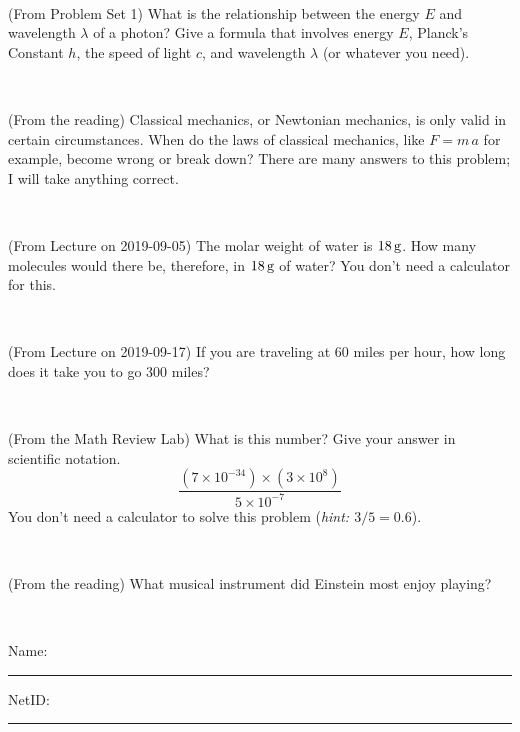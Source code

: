 \documentclass[12pt, letterpaper]{article}
\begin{document}
\vfill ~

\begin{problem} (From Problem Set 1)
What is the relationship between the energy $E$ and wavelength
$\lambda$ of a photon? Give a formula that involves energy $E$,
Planck's Constant $h$, the speed of light $c$, and wavelength
$\lambda$ (or whatever you need).
\end{problem}

\vfill ~

\begin{problem} (From the reading)
Classical mechanics, or Newtonian mechanics, is only valid in certain
circumstances. When do the laws of classical mechanics, like $F =
m\,a$ for example, become wrong or break down? There are many answers
to this problem; I will take anything correct.
\end{problem}


\vfill ~


\clearpage


\begin{problem} (From Lecture on 2019-09-05)
The molar weight of water is $18\,\mathrm{g}$. How many molecules would there
be, therefore, in $18\,\mathrm{g}$ of water? You don't need a calculator for
this.
\end{problem}


\vfill ~

\begin{problem} (From Lecture on 2019-09-17)
If you are traveling at 60 miles per hour, how long does
it take you to go 300 miles?
\end{problem}


\vfill ~

\begin{problem} (From the Math Review Lab)
What is this number? Give your answer in scientific notation.
$$
\frac{(7\times10^{-34})\times(3\times10^8)}{5\times10^{-7}}
$$
You don't need a calculator to solve this problem (\textit{hint: $3/5=0.6$}).
\end{problem}


\vfill ~

\begin{problem} (From the reading)
What musical instrument did Einstein most enjoy playing?
\end{problem}


\vfill ~


\cleardoublepage



\noindent
Name: \rule[-1ex]{0.60\textwidth}{0.1pt}
NetID: \rule[-1ex]{0.20\textwidth}{0.1pt}
\end{document}
